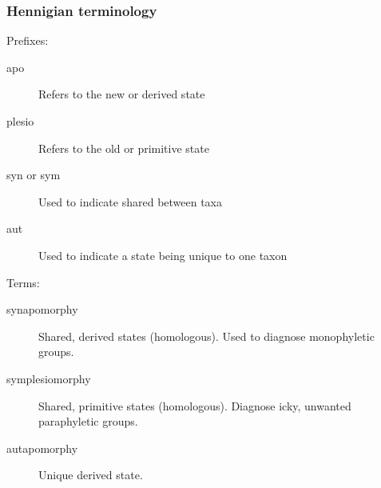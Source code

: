 \begin{frame}
\frametitle{Hennigian terminology}
Prefixes:
\begin{description}
	\item[apo] Refers to the new or derived state
	\item[plesio] Refers to the old or primitive state
    \item[syn or sym] Used to indicate shared between taxa
    \item[aut] Used to indicate a state being unique to one taxon
\end{description}
Terms:
\begin{description}
    \item[synapomorphy] Shared, derived states (homologous). Used to diagnose monophyletic groups.
    \item[symplesiomorphy] Shared, primitive states (homologous). Diagnose icky, unwanted paraphyletic groups.
    \item[autapomorphy] Unique derived state.
\end{description}
\end{frame}

